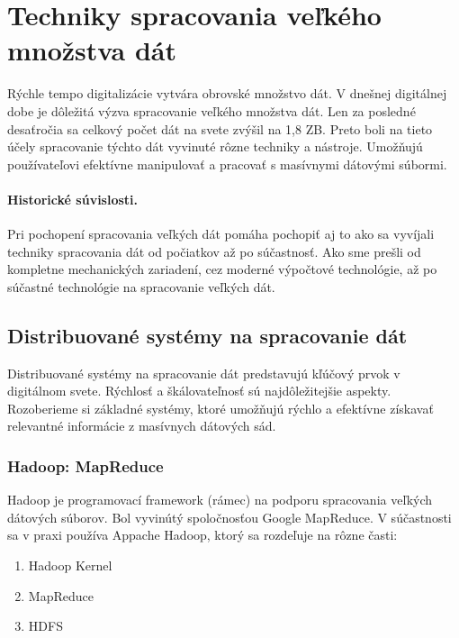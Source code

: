 \documentclass[10pt,slovak,a4paper]{article}
\begin{document}
\section{Techniky spracovania veľkého množstva dát} \label{Techniky}

Rýchle tempo digitalizácie vytvára obrovské množstvo dát. V dnešnej digitálnej dobe je dôležitá výzva spracovanie veľkého množstva dát. Len za posledné desaťročia sa celkový počet dát na svete zvýšil na 1,8 ZB\cite{Survey}. Preto boli na tieto účely spracovanie týchto dát vyvinuté rôzne techniky a nástroje. Umožňujú používateľovi efektívne manipulovať a pracovať s masívnymi dátovými súbormi.

\paragraph{Historické súvislosti.}
Pri pochopení spracovania veľkých dát pomáha pochopiť aj to ako sa vyvíjali techniky spracovania dát od počiatkov až po súčastnosť. Ako sme prešli od kompletne mechanických zariadení, cez moderné výpočtové technológie, až po súčastné technológie na spracovanie veľkých dát.

\subsection{Distribuované systémy na spracovanie dát} \label{Distribuovane}

Distribuované systémy na spracovanie dát predstavujú kľúčový prvok v digitálnom svete. Rýchlosť a škálovateľnosť sú najdôležitejšie aspekty. Rozoberieme si základné systémy, ktoré umožňujú rýchlo a efektívne získavať relevantné informácie z masívnych dátových sád.

\subsubsection {Hadoop: MapReduce}

Hadoop je programovací framework (rámec) na podporu spracovania veľkých dátových súborov. Bol vyvinútý spoločnosťou Google MapReduce. V súčastnosti sa v praxi používa Appache Hadoop, ktorý sa rozdeľuje na rôzne časti:

\begin{enumerate}
\item Hadoop Kernel
\item MapReduce
\item HDFS
\end{enumerate}
\end{document}
